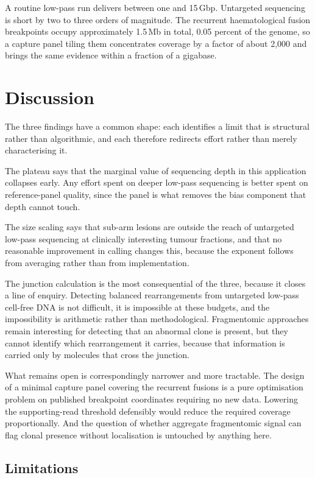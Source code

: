 \documentclass[conference]{IEEEtran}
\begin{document}
A routine low-pass run delivers between one and 15\,Gbp. Untargeted sequencing
is short by two to three orders of magnitude. The recurrent haematological
fusion breakpoints occupy approximately 1.5\,Mb in total, 0.05 percent of the
genome, so a capture panel tiling them concentrates coverage by a factor of
about 2{,}000 and brings the same evidence within a fraction of a gigabase.

\section{Discussion}

The three findings have a common shape: each identifies a limit that is
structural rather than algorithmic, and each therefore redirects effort rather
than merely characterising it.

The plateau says that the marginal value of sequencing depth in this
application collapses early. Any effort spent on deeper low-pass sequencing is
better spent on reference-panel quality, since the panel is what removes the
bias component that depth cannot touch.

The size scaling says that sub-arm lesions are outside the reach of untargeted
low-pass sequencing at clinically interesting tumour fractions, and that no
reasonable improvement in calling changes this, because the exponent follows
from averaging rather than from implementation.

The junction calculation is the most consequential of the three, because it
closes a line of enquiry. Detecting balanced rearrangements from untargeted
low-pass cell-free DNA is not difficult, it is impossible at these budgets, and
the impossibility is arithmetic rather than methodological. Fragmentomic
approaches \cite{cristiano2019fragmentation} remain interesting for detecting
that an abnormal clone is present, but they cannot identify which rearrangement
it carries, because that information is carried only by molecules that cross
the junction.

What remains open is correspondingly narrower and more tractable. The design of
a minimal capture panel covering the recurrent fusions is a pure optimisation
problem on published breakpoint coordinates requiring no new data. Lowering the
supporting-read threshold defensibly would reduce the required coverage
proportionally. And the question of whether aggregate fragmentomic signal can
flag clonal presence without localisation is untouched by anything here.

\subsection{Limitations}
\end{document}
